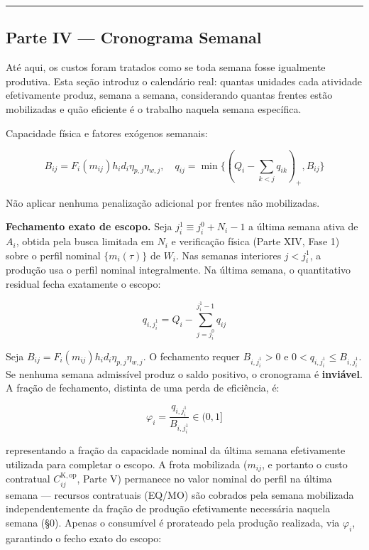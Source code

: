 \documentclass[
  10pt,
]{article}
\begin{document}
\begin{center}\rule{0.5\linewidth}{0.5pt}\end{center}

\hypertarget{parte-iv-cronograma-semanal}{%
\subsection{Parte IV --- Cronograma
Semanal}\label{parte-iv-cronograma-semanal}}

Até aqui, os custos foram tratados como se toda semana fosse igualmente
produtiva. Esta seção introduz o calendário real: quantas unidades cada
atividade efetivamente produz, semana a semana, considerando quantas
frentes estão mobilizadas e quão eficiente é o trabalho naquela semana
específica.

Capacidade física e fatores exógenos semanais:

\[\boxed{B_{ij}=F_i(m_{ij})h_id_i\eta_{p,j}\eta_{w,j},
\quad q_{ij}=\min\{(Q_i-\sum_{k<j}q_{ik})_+,B_{ij}\}}\]

Não aplicar nenhuma penalização adicional por frentes não mobilizadas.

\textbf{Fechamento exato de escopo.} Seja \(j_i^1 \equiv j_i^0+N_i-1\) a
última semana ativa de \(A_i\), obtida pela busca limitada em \(N_i\) e verificação física
(Parte XIV, Fase 1) sobre o perfil nominal \(\{m_i(\tau)\}\) de \(W_i\).
Nas semanas interiores \(j<j_i^1\), a produção usa o perfil nominal
integralmente. Na última semana, o quantitativo residual fecha
exatamente o escopo:

\[q_{i,j_i^1} = Q_i - \sum_{j=j_i^0}^{j_i^1-1} q_{ij}\]

Seja \(B_{ij}=F_i(m_{ij})h_id_i\eta_{p,j}\eta_{w,j}\).
O fechamento requer \(B_{i,j_i^1}>0\) e
\(0<q_{i,j_i^1}\le B_{i,j_i^1}\). Se nenhuma semana admissível
produz o saldo positivo, o cronograma é \textbf{inviável}.
A fração de fechamento, distinta de uma perda de eficiência, é:

\[\boxed{\varphi_i=\frac{q_{i,j_i^1}}{B_{i,j_i^1}}\in(0,1]}\]

representando a fração da capacidade nominal da última semana
efetivamente utilizada para completar o escopo. A frota mobilizada
(\(m_{ij}\), e portanto o custo contratual \(C_{ij}^{\mathrm{K,op}}\),
Parte V) permanece no valor nominal do perfil na última semana ---
recursos contratuais (EQ/MO) são cobrados pela semana mobilizada
independentemente da fração de produção efetivamente necessária naquela
semana (§0). Apenas o consumível é prorateado pela produção realizada,
via \(\varphi_i\), garantindo o fecho exato do escopo:
\end{document}
